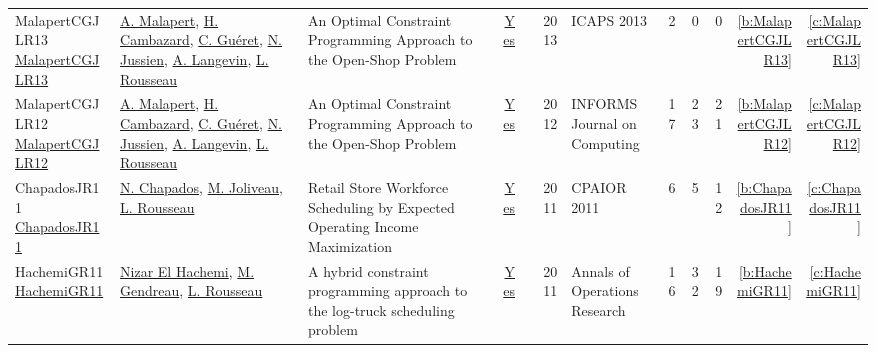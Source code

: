 {\begin{longtable}{>{\raggedright\arraybackslash}p{3cm}>{\raggedright\arraybackslash}p{6cm}>{\raggedright\arraybackslash}p{6.5cm}rrrp{2.5cm}rrrrr}
MalapertCGJLR13 \href{http://www.aaai.org/ocs/index.php/ICAPS/ICAPS13/paper/view/6016}{MalapertCGJLR13} & \hyperref[auth:a82]{A. Malapert}, \hyperref[auth:a1025]{H. Cambazard}, \hyperref[auth:a296]{C. Gu{\'{e}}ret}, \hyperref[auth:a250]{N. Jussien}, \hyperref[auth:a655]{A. Langevin}, \hyperref[auth:a332]{L. Rousseau} & An Optimal Constraint Programming Approach to the Open-Shop Problem & \href{../works/MalapertCGJLR13.pdf}{Yes} & \cite{MalapertCGJLR13} & 2013 & ICAPS 2013 & 2 & 0 & 0 & \ref{b:MalapertCGJLR13} & \ref{c:MalapertCGJLR13}\\
MalapertCGJLR12 \href{https://doi.org/10.1287/ijoc.1100.0446}{MalapertCGJLR12} & \hyperref[auth:a82]{A. Malapert}, \hyperref[auth:a1025]{H. Cambazard}, \hyperref[auth:a296]{C. Gu{\'{e}}ret}, \hyperref[auth:a250]{N. Jussien}, \hyperref[auth:a655]{A. Langevin}, \hyperref[auth:a332]{L. Rousseau} & An Optimal Constraint Programming Approach to the Open-Shop Problem & \href{../works/MalapertCGJLR12.pdf}{Yes} & \cite{MalapertCGJLR12} & 2012 & INFORMS Journal on Computing & 17 & 23 & 21 & \ref{b:MalapertCGJLR12} & \ref{c:MalapertCGJLR12}\\
ChapadosJR11 \href{https://doi.org/10.1007/978-3-642-21311-3\_7}{ChapadosJR11} & \hyperref[auth:a350]{N. Chapados}, \hyperref[auth:a351]{M. Joliveau}, \hyperref[auth:a332]{L. Rousseau} & Retail Store Workforce Scheduling by Expected Operating Income Maximization & \href{../works/ChapadosJR11.pdf}{Yes} & \cite{ChapadosJR11} & 2011 & CPAIOR 2011 & 6 & 5 & 12 & \ref{b:ChapadosJR11} & \ref{c:ChapadosJR11}\\
HachemiGR11 \href{https://doi.org/10.1007/s10479-010-0698-x}{HachemiGR11} & \hyperref[auth:a625]{Nizar El Hachemi}, \hyperref[auth:a626]{M. Gendreau}, \hyperref[auth:a332]{L. Rousseau} & A hybrid constraint programming approach to the log-truck scheduling problem & \href{../works/HachemiGR11.pdf}{Yes} & \cite{HachemiGR11} & 2011 & Annals of Operations Research & 16 & 32 & 19 & \ref{b:HachemiGR11} & \ref{c:HachemiGR11}\\
\end{longtable}
}

\clearpage
